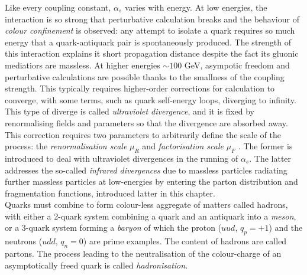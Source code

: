 Like every coupling constant, $\alpha_s$ varies with energy. At low energies, the interaction is so strong that perturbative calculation breaks and the behaviour of \textit{colour confinement} is observed: any attempt to isolate a quark requires so much energy that a quark-antiquark pair is spontaneously produced. The strength of this interaction explains it short propagation distance despite the fact its gluonic mediatiors are massless. At higher energies $\sim 100$ GeV, asympotic freedom and perturbative calculations are possible thanks to the smallness of the coupling strength. This typically requires higher-order corrections for calculation to converge, with some terms, such as quark self-energy loops, diverging to infinity. This type of diverge is  called \textit{ultraviolet divergence}, and it is fixed by renormalising fields and parameters so that the divergence are absorbed away. This correction requires two parameters to arbitrarily define the scale of the process: the \textit{renormalisation scale} $\mu_R$ and \textit{factorisation scale} $\mu_F$ \cite{collins2004factorization}. The former is introduced to deal with ultraviolet divergences in the running of $\alpha_s$. The latter addresses the so-called \textit{infrared divergences} due to massless particles radiating further massless particles at low-energies by entering the parton distribution and fragmentation functions, introduced latter in this chapter.\\

Quarks must combine to form colour-less aggregate of matters called hadrons, with either a 2-quark system combining a quark and an antiquark into a \textit{meson}, or a 3-quark system forming a \textit{baryon} of which the proton ($uud$, $q_p = +1$) and the neutrons ($udd$, $q_n = 0$) are prime examples. The content of hadrons are called partons. The process leading to the neutralisation of the colour-charge of an asymptotically freed quark is called \textit{hadronisation}.\\

